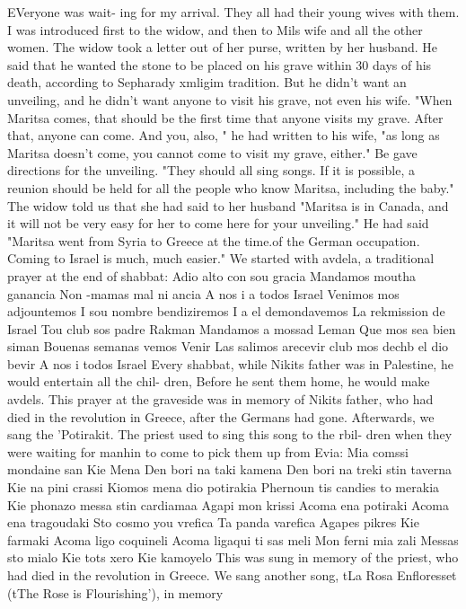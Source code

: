 EVeryone was wait-
ing for my arrival.
They all had their young wives with them.
I was introduced first 
to the widow, and then to Mils wife and all the other women.
The widow took a letter 
out of her purse, written by her husband.
He said that he wanted the stone to be placed 
on his grave within 30 days of his death, according to Sepharady xmligim tradition.
But 
he didn't want an unveiling, and he didn't want anyone to visit his grave, not even his 
wife.
"When Maritsa comes, that should be the first time that anyone visits my grave.
After that, anyone can come.
And you, also, " he had written to his wife, "as long as 
Maritsa doesn't come, you cannot come to visit my grave, either."
Be gave directions 
for the unveiling.
"They should all sing songs.
If it is possible, a reunion should 
be held for all the people who know Maritsa, including the baby."
The widow told us that she had said to her husband "Maritsa is in Canada, and it 
will not be very easy for her to come here for your unveiling."
He had said "Maritsa 
went from Syria to Greece at the time.of the German occupation.
Coming to Israel is 
much, much easier."
We started with avdela, a traditional prayer at the end of shabbat: 
Adio alto con sou gracia 
Mandamos moutha ganancia 
Non -mamas mal ni ancia 
A nos i a todos Israel 
Venimos mos adjountemos 
I sou nombre bendiziremos 
I a el demondavemos 
La rekmission de Israel 
Tou club sos padre Rakman 
Mandamos a mossad Leman 
Que mos sea bien siman 
Bouenas semanas vemos 
Venir 
Las salimos arecevir 
club mos dechb el dio bevir 
A nos i todos Israel 
Every shabbat, while Nikits father was in Palestine, he would entertain all the chil-
dren, Before he sent them home, he would make avdels.
This prayer at the graveside 
was in memory of Nikits father, who had died in the revolution in Greece, after the 
Germans had gone.
Afterwards, we sang the 'Potirakit.
The priest used to sing this song to the rbil-
dren when they were waiting for manhin to come to pick them up from Evia: 
Mia comssi mondaine san Kie Mena 
Den bori na taki kamena 
Den bori na treki stin taverna 
Kie na pini crassi 
Kiomos mena dio potirakia 
Phernoun tis candies to merakia 
Kie phonazo messa stin cardiamaa 
Agapi mon krissi 
Acoma ena potiraki 
Acoma ena tragoudaki 
Sto cosmo you vrefica 
Ta panda varefica 
Agapes pikres Kie farmaki 
Acoma ligo coquineli 
Acoma ligaqui ti sas meli 
Mon ferni mia zali 
Messas sto mialo 
Kie tots xero Kie kamoyelo 
This was sung in memory of the priest, who had died in the revolution in Greece.
We sang another song, tLa Rosa Enfloresset (tThe Rose is Flourishing'), in memory 
